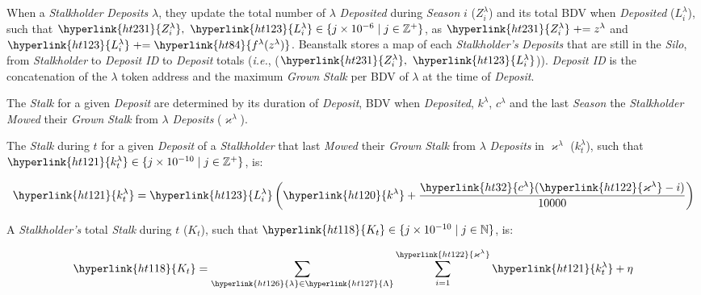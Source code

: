 \documentclass[tikz]{article}
\newcommand{\term}[1]{\textsl{#1}}
\newcommand{\bean}{} %
\begin{document}
When a \term{Stalkholder} \term{Deposits} \hyperlink{ht126}{$\lambda$}, they update the total number of \hyperlink{ht126}{$\lambda$} \term{Deposited} during \term{Season} $i$ (\hyperlink{ht231}{$Z_i^{\lambda}$}) and its total BDV when \term{Deposited} (\hyperlink{ht123}{$L_i^{\lambda}$}), such that $\hyperlink{ht231}{Z_i^{\lambda}},\ \hyperlink{ht123}{L_i^{\lambda}} \in \{j \times 10^{-6} \mid j \in \mathbb{Z}^{+} \}$, as $\hyperlink{ht231}{Z_i^{\lambda}} \mathrel{+}= z^{\lambda}$ and $\hyperlink{ht123}{L_i^{\lambda}} \mathrel{+}= \hyperlink{ht84}{f^{\lambda}(z^{\lambda})}$. Beanstalk stores a map of each \term{Stalkholder's} \term{Deposits} that are still in the \term{Silo}, from \term{Stalkholder} to \term{Deposit ID} to \term{Deposit} totals (\term{i.e.}, ($\hyperlink{ht231}{Z_i^{\lambda}},\ \hyperlink{ht123}{L_i^{\lambda}}$)). \term{Deposit ID} is the concatenation of the \hyperlink{ht126}{$\lambda$} token address and the maximum \term{Grown} \term{Stalk} per BDV of \hyperlink{ht126}{$\lambda$} at the time of \term{Deposit}.

The \term{Stalk} for a given \term{Deposit} are determined by its duration of \term{Deposit}, BDV when \term{Deposited}, \hyperlink{ht120}{$k^{\lambda}$}, \hyperlink{ht32}{$c^{\lambda}$} and the last \term{Season} the \term{Stalkholder} \term{Mowed} their \term{Grown} \term{Stalk} from \hyperlink{ht126}{$\lambda$} \term{Deposits} (\hyperlink{ht122}{$\varkappa^{\lambda}$}).

The \term{Stalk} during \hyperlink{ht204}{$t$} for a given \term{Deposit} of a \term{Stalkholder} that last \term{Mowed} their \term{Grown} \term{Stalk} from \hyperlink{ht126}{$\lambda$} \term{Deposits} in \hyperlink{ht122}{$\varkappa^{\lambda}$} (\hyperlink{ht121}{$k_{t}^{\lambda}$}), such that $\hyperlink{ht121}{k_{t}^{\lambda}} \in \{j \times 10^{-10} \mid j \in \mathbb{Z}^{+} \}$, is:

    $$
        \hyperlink{ht121}{k_{t}^{\lambda}} = 
            \hyperlink{ht123}{L_i^{\lambda}}\left
                (\hyperlink{ht120}{k^{\lambda}} + \frac{\hyperlink{ht32}{c^{\lambda}}(\hyperlink{ht122}{\varkappa^{\lambda}} - i)}
                    {10000}\right)
    $$

A \term{Stalkholder's} total \term{Stalk} during \hyperlink{ht204}{$t$} (\hyperlink{ht118}{$K_t$}), such that $\hyperlink{ht118}{K_t} \in \{j \times 10^{-10} \mid j \in \mathbb{N} \}$, is:

    $$
        \hyperlink{ht118}{K_t} = 
            \sum_{\hyperlink{ht126}{\lambda} \in \hyperlink{ht127}{\Lambda}} 
                \sum_{i=1}^{\hyperlink{ht122}{\varkappa^{\lambda}}} 
                    \hyperlink{ht121}{k_{t}^{\lambda}} + \eta^{\bean}
    $$
\end{document}
